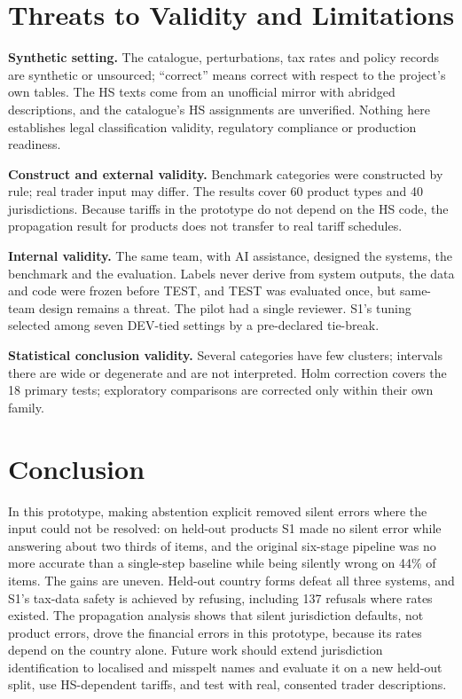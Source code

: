 \documentclass[conference]{IEEEtran}
\begin{document}
\section{Threats to Validity and Limitations}
\textbf{Synthetic setting.} The catalogue, perturbations, tax rates and policy records are synthetic or unsourced;
``correct'' means correct with respect to the project's own tables. The HS texts come from an unofficial mirror with
abridged descriptions, and the catalogue's HS assignments are unverified. Nothing here establishes legal classification
validity, regulatory compliance or production readiness.

\textbf{Construct and external validity.} Benchmark categories were constructed by rule; real trader input may differ.
The results cover 60 product types and 40 jurisdictions. Because tariffs in the prototype do not depend on the HS code,
the propagation result for products does not transfer to real tariff schedules.

\textbf{Internal validity.} The same team, with AI assistance, designed the systems, the benchmark and the evaluation.
Labels never derive from system outputs, the data and code were frozen before TEST, and TEST was evaluated once, but
same-team design remains a threat. The pilot had a single reviewer. S1's tuning selected among seven DEV-tied settings
by a pre-declared tie-break.

\textbf{Statistical conclusion validity.} Several categories have few clusters; intervals there are wide or degenerate
and are not interpreted. Holm correction covers the 18 primary tests; exploratory comparisons are corrected only within
their own family.

\section{Conclusion}
In this prototype, making abstention explicit removed silent errors where the input could not be resolved: on held-out
products S1 made no silent error while answering about two thirds of items, and the original six-stage pipeline was no
more accurate than a single-step baseline while being silently wrong on 44\% of items. The gains are uneven. Held-out
country forms defeat all three systems, and S1's tax-data safety is achieved by refusing, including 137 refusals where
rates existed. The propagation analysis shows that silent jurisdiction defaults, not product errors, drove the
financial errors in this prototype, because its rates depend on the country alone. Future work should extend
jurisdiction identification to localised and misspelt names and evaluate it on a new held-out split, use HS-dependent
tariffs, and test with real, consented trader descriptions.
\end{document}
